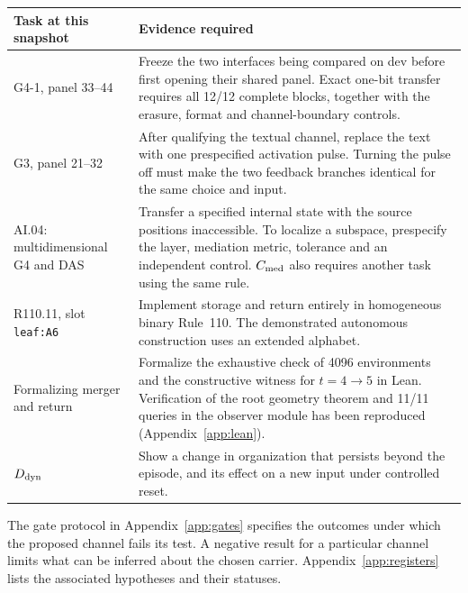 \begin{center}\small
\begin{tabularx}{\linewidth}{@{}p{.23\linewidth}X@{}}\toprule
Task at this snapshot & Evidence required \\\midrule
G4-1, panel 33--44 & Freeze the two interfaces being compared on dev before first opening their shared panel. Exact one-bit transfer requires all 12/12 complete blocks, together with the erasure, format and channel-boundary controls.\\
G3, panel 21--32 & After qualifying the textual channel, replace the text with one prespecified activation pulse. Turning the pulse off must make the two feedback branches identical for the same choice and input.\\
AI.04: multidimensional G4 and DAS & Transfer a specified internal state with the source positions inaccessible. To localize a subspace, prespecify the layer, mediation metric, tolerance and an independent control. $C_{\rm med}$ also requires another task using the same rule.\\
R110.11, slot \texttt{leaf:A6} & Implement storage and return entirely in homogeneous binary Rule~110. The demonstrated autonomous construction uses an extended alphabet.\\
Formalizing merger and return & Formalize the exhaustive check of 4096 environments and the constructive witness for $t=4\to5$ in Lean. Verification of the root geometry theorem and 11/11 queries in the observer module has been reproduced (Appendix~\ref{app:lean}).\\
$D_{\rm dyn}$ & Show a change in organization that persists beyond the episode, and its effect on a new input under controlled reset.\\
\bottomrule\end{tabularx}
\end{center}
The gate protocol in Appendix~\ref{app:gates} specifies the outcomes under which the proposed channel fails its test. A negative result for a particular channel limits what can be inferred about the chosen carrier. Appendix~\ref{app:registers} lists the associated hypotheses and their statuses.
